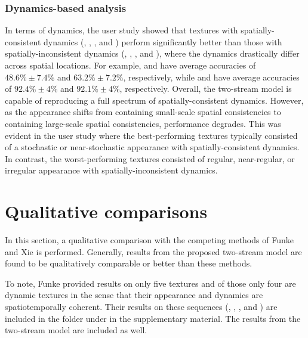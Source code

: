 \subsubsection{Dynamics-based analysis}

In terms of dynamics, the user study showed that textures with
spatially-consistent dynamics (\eg, , 
, and  ) perform 
significantly better than those with spatially-inconsistent 
dynamics (\eg, , , 
and ), where the dynamics drastically differ 
across spatial locations.
For example,  and 
have average accuracies of $48.6\% \pm 7.4\%$ and
$63.2\% \pm 7.2\%$, respectively, while
 and  have average 
accuracies of $92.4\% \pm 4\%$ and $92.1\% \pm 4\%$, 
respectively.
Overall, the two-stream model is capable of reproducing a full spectrum
of spatially-consistent dynamics.
However, as the appearance shifts from containing small-scale 
spatial consistencies to containing large-scale spatial consistencies,
performance degrades.
This was evident in the user study where the best-performing 
textures typically consisted of a stochastic or
near-stochastic appearance with spatially-consistent 
dynamics.
In contrast, the worst-performing textures consisted of
regular, near-regular, or irregular appearance with
spatially-inconsistent dynamics.

\section{Qualitative comparisons}

In this section, a qualitative comparison with the competing methods of Funke 
\etal \cite{funke2017} and Xie \etal \cite{xie2017synthesizing} is performed. 
Generally, results from the proposed two-stream model are found to be qualitatively comparable or better than these methods.

To note, Funke \etal \cite{funke2017} provided results on
only five textures and of those only four
are dynamic textures in the sense that their appearance
and dynamics are spatiotemporally coherent.
Their results on these sequences (, , 
, and ) are included in the folder
 under  in the supplementary material.
The results from the two-stream model are included as well.

